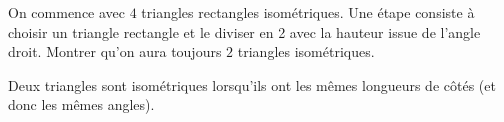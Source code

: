 On commence avec $4$ triangles rectangles isométriques. Une étape consiste à choisir un triangle rectangle et le diviser en 2 avec la hauteur issue de l'angle droit. Montrer qu'on aura toujours $2$ triangles isométriques.

Deux triangles sont isométriques lorsqu'ils ont les mêmes longueurs de côtés (et donc les mêmes angles).
